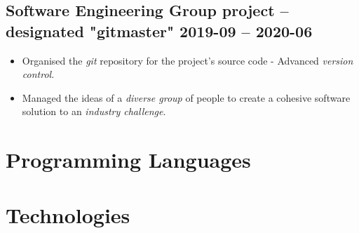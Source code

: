     \subsection{Software Engineering Group project -- designated "gitmaster"
    \hfill 2019-09 -- 2020-06}
        \begin{itemize}
            \item Organised the \emph{git} repository for the project's source
                code - Advanced \emph{version control}.
            \item Managed the ideas of a \emph{diverse group} of people to
                create a cohesive software solution to an \emph{industry
                challenge}.
        \end{itemize}
\section{Programming Languages}
\section{Technologies}

